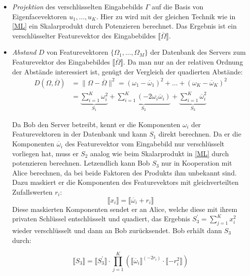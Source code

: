 \begin{itemize} 
\item \textit{Projektion} des verschlüsselten Eingabebilds $\Gamma$ auf die Basis von Eigenfacevektoren $u_1,\ldots,u_K$. Hier zu wird mit der gleichen Technik wie in \ref{ML} ein Skalarprodukt durch Potenzieren berechnet. Das Ergebnis ist ein verschlüsselter Featurevektor des Eingabebildes  $\llbracket\overline\Omega\rrbracket$.
\item \textit{Abstand} $D$ von Featurevektoren $\{\Omega_1,\ldots,\Omega_M\}$ der Datenbank des Servers zum Featurevektor des Eingabebildes $\llbracket\overline\Omega\rrbracket$. Da man nur an der relativen Ordnung der Abstände interessiert ist, genügt der Vergleich der quadierten Abstände:
\begin{equation*}
\begin{aligned}
D(\Omega,\overline\Omega)
&=
\|\Omega-\overline\Omega\|^2=(\omega_1-\overline\omega_1)^2+\ldots+(\omega_K-\overline\omega_K)^2\\
&=
\underbrace{\sum_{i=1}^{K}\omega_{i}^2}_{S_1}+
\underbrace{\sum_{i=1}^{K}(-2\omega_i\overline\omega_i)}_{S_2}+
\underbrace{\sum_{i=1}^{K}\overline\omega_{i}^2}_{S_3}
\end{aligned}
\end{equation*}

Da Bob den Server betreibt, kennt er die Komponenten $\omega_i$ der Featurevektoren in der Datenbank und kann $S_1$ direkt berechnen. Da er die Komponenten $\overline\omega_i$ des Featurevektor vom Eingabebild nur verschlüsselt vorliegen hat, muss er $S_2$ analog wie beim Skalarprodukt in \ref{ML} durch potenzieren berechnen. Letzendlich kann Bob $S_3$ nur in Kooperation mit Alice berechnen, da bei beide Faktoren des Produkts ihm unbekannt sind. Dazu maskiert er die Komponenten des Featurevektors mit gleichverteilten Zufallswerten $r_i$:
\begin{equation*}
\llbracket x_i \rrbracket = \llbracket\overline\omega_i+r_i\rrbracket
\end{equation*}
Diese maskierten Komponenten sendet er an Alice, welche diese mit ihrem privaten Schlüssel entschlüsselt und quadiert, das Ergebnis $S_{3}^{'}=\sum_{j=1}^{K} x_{i}^2$ wieder verschlüsselt und dann an Bob zurücksendet. Bob erhält dann $S_3$ durch:

\begin{equation*}
\llbracket S_3 \rrbracket = \llbracket S_{3}^{'} \rrbracket \cdot \prod_{j=1}^{K}
\left(\llbracket\overline\omega_i \rrbracket^{(-2r_i)}\cdot\llbracket-r_{i}^{2}\rrbracket\right)
\end{equation*}


\end{itemize}
